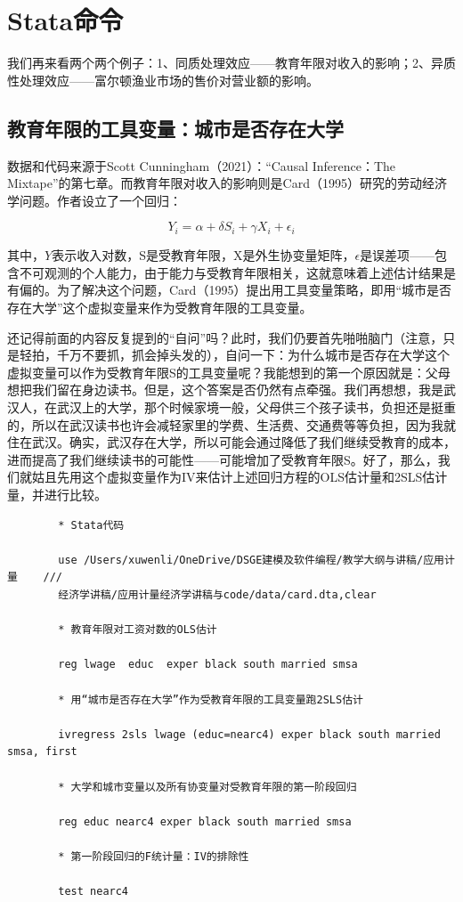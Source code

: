 \documentclass[cn,12pt,math=newtx,citestyle=gb7714-2015,bibstyle=gb7714-2015]{elegantbook}
\begin{document}
	
	\section{Stata命令}
	
	我们再来看两个两个例子：1、同质处理效应——教育年限对收入的影响；2、异质性处理效应——富尔顿渔业市场的售价对营业额的影响。
	
	\subsection{教育年限的工具变量：城市是否存在大学}
	
	数据和代码来源于Scott Cunningham（2021）：“Causal Inference：The Mixtape”的第七章。而教育年限对收入的影响则是Card（1995）研究的劳动经济学问题。作者设立了一个回归：
	
	\begin{equation}
		Y_i = \alpha +\delta S_i + \gamma X_i +\epsilon_i
	\end{equation}
	
	其中，$Y$表示收入对数，S是受教育年限，X是外生协变量矩阵，$\epsilon$是误差项——包含不可观测的个人能力，由于能力与受教育年限相关，这就意味着上述估计结果是有偏的。为了解决这个问题，Card（1995）提出用工具变量策略，即用“城市是否存在大学”这个虚拟变量来作为受教育年限的工具变量。
	
	还记得前面的内容反复提到的“自问”吗？此时，我们仍要首先啪啪脑门（注意，只是轻拍，千万不要抓，抓会掉头发的），自问一下：为什么城市是否存在大学这个虚拟变量可以作为受教育年限S的工具变量呢？我能想到的第一个原因就是：父母想把我们留在身边读书。但是，这个答案是否仍然有点牵强。我们再想想，我是武汉人，在武汉上的大学，那个时候家境一般，父母供三个孩子读书，负担还是挺重的，所以在武汉读书也许会减轻家里的学费、生活费、交通费等等负担，因为我就住在武汉。确实，武汉存在大学，所以可能会通过降低了我们继续受教育的成本，进而提高了我们继续读书的可能性——可能增加了受教育年限S。好了，那么，我们就姑且先用这个虚拟变量作为IV来估计上述回归方程的OLS估计量和2SLS估计量，并进行比较。
	
	\begin{lstlisting}
		* Stata代码
		
		use /Users/xuwenli/OneDrive/DSGE建模及软件编程/教学大纲与讲稿/应用计量    ///
		经济学讲稿/应用计量经济学讲稿与code/data/card.dta,clear
		
		* 教育年限对工资对数的OLS估计
		
		reg lwage  educ  exper black south married smsa
		
		* 用“城市是否存在大学”作为受教育年限的工具变量跑2SLS估计
		
		ivregress 2sls lwage (educ=nearc4) exper black south married smsa, first 
		
		* 大学和城市变量以及所有协变量对受教育年限的第一阶段回归
		
		reg educ nearc4 exper black south married smsa
		
		* 第一阶段回归的F统计量：IV的排除性
		
		test nearc4
	\end{lstlisting}
	
\end{document}

